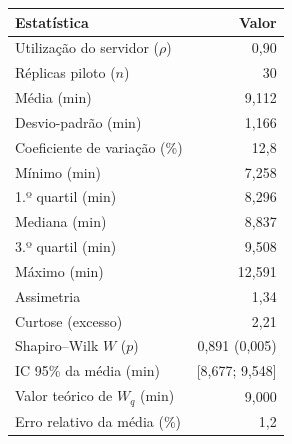 \begin{tabular}{lr}
\toprule
Estatística & Valor \\
\midrule
Utilização do servidor ($\rho$) & 0,90 \\
Réplicas piloto ($n$) & 30 \\
Média (min) & 9,112 \\
Desvio-padrão (min) & 1,166 \\
Coeficiente de variação (\%) & 12,8 \\
Mínimo (min) & 7,258 \\
1.º quartil (min) & 8,296 \\
Mediana (min) & 8,837 \\
3.º quartil (min) & 9,508 \\
Máximo (min) & 12,591 \\
Assimetria & 1,34 \\
Curtose (excesso) & 2,21 \\
Shapiro--Wilk $W$ ($p$) & 0,891 (0,005) \\
IC 95\% da média (min) & [8,677; 9,548] \\
\midrule
Valor teórico de $W_q$ (min) & 9,000 \\
Erro relativo da média (\%) & 1,2 \\
\bottomrule
\end{tabular}
